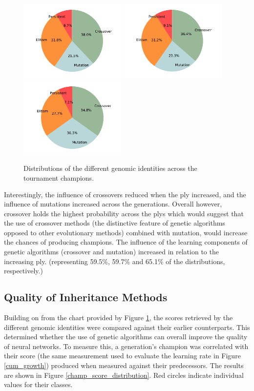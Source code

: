 \documentclass[12pt,a4paper]{article}
\begin{document}
        \begin{figure}[!ht]
            \centering
            \includegraphics[width=53mm]{images/results/1ply/champ_gen_dist.pdf}
            \includegraphics[width=53mm]{images/results/3ply/champ_gen_dist.pdf}
            \includegraphics[width=53mm]{images/results/6ply/champ_gen_dist.pdf}
            \caption{Distributions of the different genomic identities across the tournament champions. \label{champ_gen_dist}}
        \end{figure}

        Interestingly, the influence of crossovers reduced when the ply increased, and the influence of mutations increased across the generations. Overall however, crossover holds the highest probability across the plys which would suggest that the use of crossover methods (the distinctive feature of genetic algorithms opposed to other evolutionary methods) combined with mutation, would increase the chances of producing champions. The influence of the learning components of genetic algorithms (crossover and mutation) increased in relation to the increasing ply. (representing 59.5\%, 59.7\% and 65.1\% of the distributions, respectively.)

    \subsection{Quality of Inheritance Methods}
        Building on from the chart provided by Figure \ref{champ_gen_dist}, the scores retrieved by the different genomic identities were compared against their earlier counterparts. This determined whether the use of genetic algorithms can overall improve the quality of neural networks. To measure this, a generation's champion was correlated with their score (the same measurement used to evaluate the learning rate in Figure \ref{cum_growth}) produced when measured against their predecessors. The results are shown in Figure \ref{champ_score_distribution}. Red circles indicate individual values for their classes.
\end{document}
